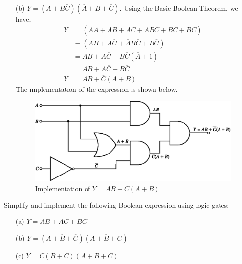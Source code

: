 \begin{solution}
\begin{itemize}
\item[(b)] $Y=(A+B\overline{C})(\overline{A}+B+\overline{C})$. Using the Basic Boolean Theorem, we have,
\begin{align*}
Y &= (A\overline{A}+AB+A\overline{C}+\overline{A}B\overline{C}+B\overline{C}+B\overline{C})\\[3pt]
&= (AB+A\overline{C}+\overline{A}B\overline{C}+B\overline{C})\\[3pt]
&= AB+A\overline{C}+B\overline{C}(\overline{A}+1)\\[3pt]
&= AB+A\overline{C}+B\overline{C}\\[3pt]
Y &= AB+\overline{C}(A+B)
\end{align*}
The implementation of the expression is shown below.
\begin{figure}[H]
\centering
\includegraphics{chap6/fig111.eps}
\caption*{Implementation of $Y=AB+\overline{C}(A+B)$}
\end{figure}
\end{itemize}
\vskip -1.2cm
\end{solution}

\eject

\begin{example}\label{exam6.30}
Simplify and implement the following Boolean expression using logic gates:
\begin{itemize}
\item[(a)] $Y=AB+\overline{A}C+BC$

\item[(b)] $Y=(A+\overline{B}+\overline{C})(A+\overline{B}+C)$

\item[(c)] $Y=C(B+C)(A+B+C)$
\end{itemize}
\end{example}

